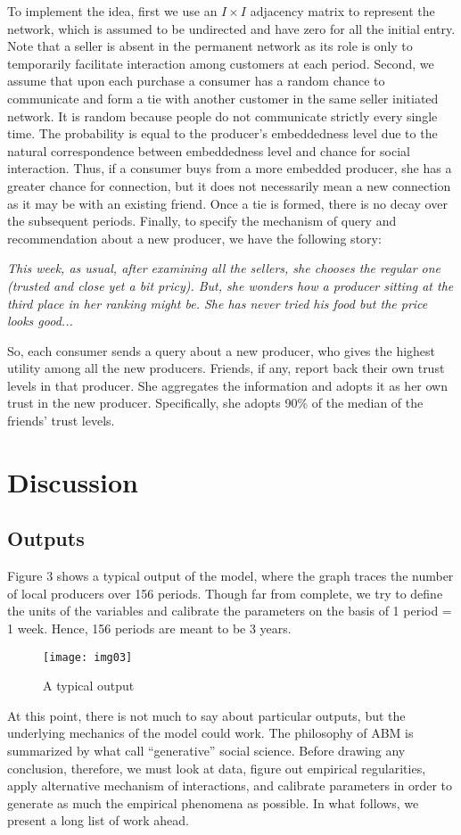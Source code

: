\documentclass[11pt, oneside]{article}
\begin{document}
To implement the idea, first we use an $I \times I$ adjacency matrix \parencite{Jackson2008} to represent the network, which is assumed to be undirected and have zero for all the initial entry. Note that a seller is absent in the permanent network as its role is only to temporarily facilitate interaction among customers at each period. Second, we assume that upon each purchase a consumer has a random chance to communicate and form a tie with another customer in the same seller initiated network. It is random because people do not communicate strictly every single time. The probability is equal to the producer's embeddedness level due to the natural correspondence between embeddedness level and chance for social interaction. Thus, if a consumer buys from a more embedded producer, she has a greater chance for connection, but it does not necessarily mean a new connection as it may be with an existing friend. Once a tie is formed, there is no decay over the subsequent periods. Finally, to specify the mechanism of query and recommendation about a new producer, we have the following story:
\begin{adjustwidth}{1cm}{}
\textit{This week, as usual, after examining all the sellers, she chooses the regular one (trusted and close yet a bit pricy). But, she wonders how a producer sitting at the third place in her ranking might be. She has never tried his food but the price looks good...}
\end{adjustwidth}
So, each consumer sends a query about a new producer, who gives the highest utility among all the new producers. Friends, if any, report back their own trust levels in that producer. She aggregates the information and adopts it as her own trust in the new producer. Specifically, she adopts 90\% of the median of the friends' trust levels.

\section{Discussion}
\subsection{Outputs}
Figure 3 shows a typical output of the model, where the graph traces the number of local producers over 156 periods. Though far from complete, we try to define the units of the variables and calibrate the parameters on the basis of 1 period = 1 week. Hence, 156 periods are meant to be 3 years.
\begin{figure}[h]
\centering
  \texttt{[image: img03]}
  \caption{A typical output}
\end{figure}
At this point, there is not much to say about particular outputs, but the underlying mechanics of the model could work. The philosophy of ABM is summarized by what \textcite{Epstein1996} call ``generative'' social science. Before drawing any conclusion, therefore, we must look at data, figure out empirical regularities, apply alternative mechanism of interactions, and calibrate parameters in order to generate as much the empirical phenomena as possible. In what follows, we present a long list of work ahead.
\end{document}
